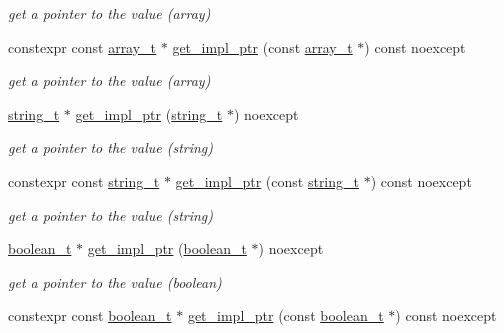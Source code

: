 \begin{DoxyCompactItemize}
\begin{DoxyCompactList}\small\item\em get a pointer to the value (array) \end{DoxyCompactList}\item 
constexpr const \hyperlink{classnlohmann_1_1basic__json_a4c409f1b6d9caf3412c78af9a5883fed}{array\+\_\+t} $\ast$ \hyperlink{classnlohmann_1_1basic__json_abefb50a81c9b91106d9ecadfcd1ee2b5}{get\+\_\+impl\+\_\+ptr} (const \hyperlink{classnlohmann_1_1basic__json_a4c409f1b6d9caf3412c78af9a5883fed}{array\+\_\+t} $\ast$) const noexcept
\begin{DoxyCompactList}\small\item\em get a pointer to the value (array) \end{DoxyCompactList}\item 
\hyperlink{classnlohmann_1_1basic__json_a61f8566a1a85a424c7266fb531dca005}{string\+\_\+t} $\ast$ \hyperlink{classnlohmann_1_1basic__json_a955d7098e5b43ee0dd8cce5f707eeb5c}{get\+\_\+impl\+\_\+ptr} (\hyperlink{classnlohmann_1_1basic__json_a61f8566a1a85a424c7266fb531dca005}{string\+\_\+t} $\ast$) noexcept
\begin{DoxyCompactList}\small\item\em get a pointer to the value (string) \end{DoxyCompactList}\item 
constexpr const \hyperlink{classnlohmann_1_1basic__json_a61f8566a1a85a424c7266fb531dca005}{string\+\_\+t} $\ast$ \hyperlink{classnlohmann_1_1basic__json_a0c0b516e06d10dced993934ba5139cc0}{get\+\_\+impl\+\_\+ptr} (const \hyperlink{classnlohmann_1_1basic__json_a61f8566a1a85a424c7266fb531dca005}{string\+\_\+t} $\ast$) const noexcept
\begin{DoxyCompactList}\small\item\em get a pointer to the value (string) \end{DoxyCompactList}\item 
\hyperlink{classnlohmann_1_1basic__json_a4c919102a9b4fe0d588af64801436082}{boolean\+\_\+t} $\ast$ \hyperlink{classnlohmann_1_1basic__json_ab1678fb6723faf020a15300c4f6b98f5}{get\+\_\+impl\+\_\+ptr} (\hyperlink{classnlohmann_1_1basic__json_a4c919102a9b4fe0d588af64801436082}{boolean\+\_\+t} $\ast$) noexcept
\begin{DoxyCompactList}\small\item\em get a pointer to the value (boolean) \end{DoxyCompactList}\item 
constexpr const \hyperlink{classnlohmann_1_1basic__json_a4c919102a9b4fe0d588af64801436082}{boolean\+\_\+t} $\ast$ \hyperlink{classnlohmann_1_1basic__json_ae068eee75c0a814e19208bae641f866c}{get\+\_\+impl\+\_\+ptr} (const \hyperlink{classnlohmann_1_1basic__json_a4c919102a9b4fe0d588af64801436082}{boolean\+\_\+t} $\ast$) const noexcept

\end{DoxyCompactItemize}
